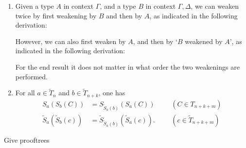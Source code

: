 \begin{enumerate}
\item Given a type $A$ in context $\Gamma$, and a type $B$ in context $\Gamma,\Delta$, we can weaken twice by first weakening by $B$ and then by $A$, as indicated in the following derivation:
\begin{prooftree}
\end{prooftree}
However, we can also first weaken by $A$, and then by `$B$ weakened by $A$', as indicated in the following derivation:
\begin{prooftree}
\end{prooftree}
For the end result it does not matter in what order the two weakenings are performed.
\item For all $a\in\tilde{T}_n$ and $b\in\tilde{T}_{n+k}$, one has
\begin{align*}
S_a(S_b(C)) & = S_{\tilde{S}_a(b)}(S_a(C)) & & & (C\in T_{n+k+m}) \\
\tilde{S}_a(\tilde{S}_b(c)) & = \tilde{S}_{\tilde{S}_a(b)}(\tilde{S}_a(c)). & & & (c\in\tilde{T}_{n+k+m})
\end{align*}
\end{enumerate}

\begin{exercises}
\item Give prooftrees
\end{exercises}
